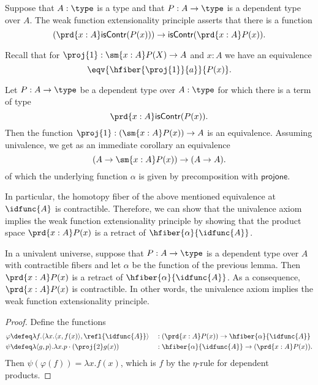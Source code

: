 \begin{defn}
Suppose that $A:\type$ is a type and that $P:A\to\type$ is a dependent type over $A$. The weak function extensionality principle asserts that there is a function
\begin{equation*}
(\prd{x:A}\mathsf{isContr}(P(x)))\to\mathsf{isContr}(\prd{x:A}P(x)).
\end{equation*}
\end{defn}

Recall that for $\proj{1}:\sm{x:A}P(X)\to A$ and $x:A$ we have an equivalence
\begin{equation*}
\eqv{\hfiber{\proj{1}}{a}}{P(x)}.
\end{equation*}

\begin{lem}
Let $P:A\to\type$ be a dependent type over $A:\type$ for which there is a term of type
\begin{equation*}
\prd{x:A}\mathsf{isContr}(P(x)).
\end{equation*}
Then the function $\proj{1}:(\sm{x:A}P(x))\to A$ is an equivalence. Assuming univalence, we get as an immediate corollary an equivalence
\begin{equation*}
(A\to\sm{x:A}P(x))\to (A\to A).
\end{equation*}
of which the underlying function $\alpha$ is given by precomposition with $\mathsf{projone}$.
\end{lem}

In particular, the homotopy fiber of the above mentioned equivalence at $\idfunc{A}$ is contractible. Therefore, we can show that the univalence axiom implies the weak function extensionality principle by showing that the product space $\prd{x:A}P(x)$ is a retract of $\hfiber{\alpha}{\idfunc{A}}$.

\begin{thm}
In a univalent universe, suppose that $P:A\to\type$ is a dependent type over $A$ with contractible fibers and let $\alpha$ be the function of the previous lemma. Then $\prd{x:A}P(x)$ is a retract of $\hfiber{\alpha}{\idfunc{A}}$. As a consequence, $\prd{x:A}P(x)$ is contractible. In other words, the univalence axiom implies the weak function extensionality principle.
\end{thm}

\begin{proof}
Define the functions
\begin{align*}
\varphi & \defeq \lambda f.\langle\lambda x.\langle x,f(x)\rangle,\refl{\idfunc{A}}\rangle & & : (\prd{x:A}P(x))\to\hfiber{\alpha}{\idfunc{A}}\\
\psi & \defeq \lambda\langle g,p\rangle.\lambda x.p\cdot(\proj{2} g(x)) & & : \hfiber{\alpha}{\idfunc{A}}\to(\prd{x:A}P(x)).
\end{align*}
Then $\psi(\varphi(f))=\lambda x.f(x)$, which is $f$ by the $\eta$-rule for dependent products.
\end{proof}

